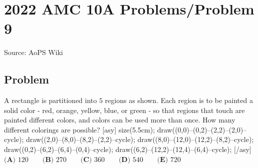 \documentclass[12pt]{article}
\begin{document}
\section*{{2022 AMC 10A Problems/Problem 9}}
Source: AoPS Wiki

\subsection*{Problem}
A rectangle is partitioned into $5$ regions as shown. Each region is to be painted a solid color - red, orange, yellow, blue, or green - so that regions that touch are painted different colors, and colors can be used more than once. How many different colorings are possible? [asy] size(5.5cm); draw((0,0)--(0,2)--(2,2)--(2,0)--cycle); draw((2,0)--(8,0)--(8,2)--(2,2)--cycle); draw((8,0)--(12,0)--(12,2)--(8,2)--cycle); draw((0,2)--(6,2)--(6,4)--(0,4)--cycle); draw((6,2)--(12,2)--(12,4)--(6,4)--cycle); [/asy] $\textbf{(A) }120\qquad\textbf{(B) }270\qquad\textbf{(C) }360\qquad\textbf{(D) }540\qquad\textbf{(E) }720$
\end{document}
